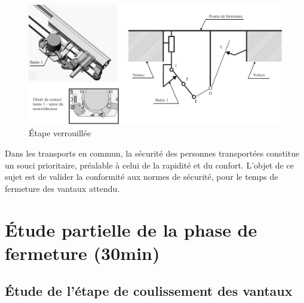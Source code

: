 \begin{figure}[!h]
 \centering\includegraphics[width=0.8\linewidth]{img/Portes9.png}
 \caption{Étape verrouillée}
 \label{fig8}
\end{figure}

Dans les transports en commun, la sécurité des personnes transportées constitue un souci prioritaire, préalable à celui de la rapidité et du confort. L'objet de ce sujet est de valider la conformité aux normes de sécurité, pour le temps de fermeture des vantaux attendu.

\newpage

\section{Étude partielle de la phase de fermeture (30min)}

\subsection{Étude de l'étape de coulissement des vantaux}

